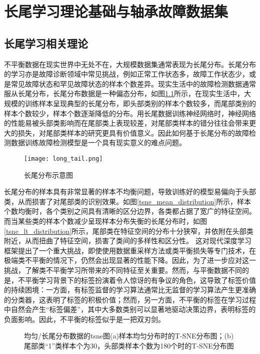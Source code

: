 \documentclass[master]{thesis-uestc}
\begin{document}
\chapter{长尾学习理论基础与轴承故障数据集}
\section{长尾学习相关理论}
不平衡数据在现实世界中无处不在，大规模数据集通常表现为长尾分布。长尾分布的学习亦是故障诊断领域中常见挑战，例如正常工作状态多，故障工作状态少，或是常见故障状态和罕见故障状态的样本个数差异。现实生活中的故障检测数据通常服从长尾分布，长尾分布数据是一种偏态分布，如图\ref{fig_long_tail}所示，在现实生活中，大规模的训练样本呈现典型的长尾分布，即头部类别的样本个数较多，而尾部类别的样本个数较少，样本个数逐渐降低的分布。用长尾数据训练神经网络时，神经网络的性能易被头部类影响而在尾部类上表现较差，对尾部类样本的错分往往会带来更大的损失，对尾部类样本的研究更具有价值意义。因此如何基于长尾分布的故障检测数据训练故障检测模型是一个具有现实意义的难点问题。
\begin{figure}[h]
    \texttt{[image: long\_tail.png]}
    \caption{长尾分布示意图}
    \label{fig_long_tail}
\end{figure}

长尾分布的样本具有非常显著的样本不均衡问题，导致训练好的模型易偏向于头部类，从而损害了对尾部类的识别效果。如图\ref{tsne_mean_distribution}所示，样本个数均衡时，各个类别之间具有清晰的区分边界，各类都占据了宽广的特征空间。而当某些类的样本个数减少呈现样本分布失衡的长尾分布时，如图\ref{tsne_lt_distribution}所示，尾部类在特征空间的分布十分狭窄，并依附在头部类附近，从而扭曲了特征空间，损害了类间的多样性和区分性。
这对现代深度学习框架提出了一个重大挑战，即使使用数据重采样方法或类平衡损失等专门技术，在极端类不平衡的情况下，仍然会出现显著的性能下降。因此，为了进一步应对这一挑战，了解类不平衡学习所带来的不同特征至关重要。然而，与平衡数据不同的是，不平衡学习背景下的标签扮演着令人惊讶的有争议的角色，这导致了标签价值的持续困境：一方面，有标签监督的学习算法通常比无监督的学习算法产生更准确的分类器，这表明了标签的积极价值；然而，另一方面，不平衡的标签在学习过程中自然会产生“标签偏差”，其中大多数类别可以显著地驱动决策边界，表明标签的负面影响。因此，不平衡的标签似乎是一把双刃剑。
\begin{figure}[h]
    \caption{均匀/长尾分布数据的tsne图(a)样本均匀分布时的T-SNE分布图；(b)尾部类“1”类样本个为30，头部类样本个数为180个时的T-SNE分布图}
    \label{long-tail result}
\end{figure}
\end{document}
